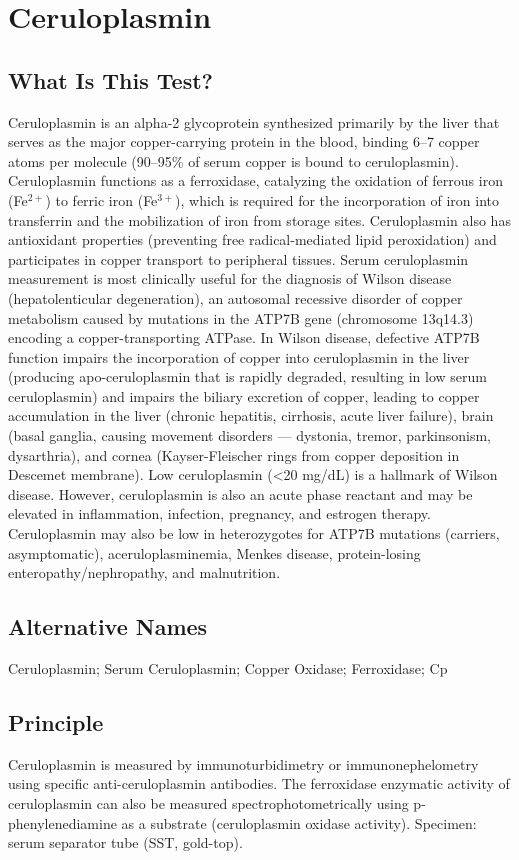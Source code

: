\chapter{Ceruloplasmin}
\section*{What Is This Test?}
Ceruloplasmin is an alpha-2 glycoprotein synthesized primarily by the liver that serves as the major copper-carrying protein in the blood, binding 6--7 copper atoms per molecule (90--95\% of serum copper is bound to ceruloplasmin). Ceruloplasmin functions as a ferroxidase, catalyzing the oxidation of ferrous iron (Fe$^{2+}$) to ferric iron (Fe$^{3+}$), which is required for the incorporation of iron into transferrin and the mobilization of iron from storage sites. Ceruloplasmin also has antioxidant properties (preventing free radical-mediated lipid peroxidation) and participates in copper transport to peripheral tissues. Serum ceruloplasmin measurement is most clinically useful for the diagnosis of Wilson disease (hepatolenticular degeneration), an autosomal recessive disorder of copper metabolism caused by mutations in the ATP7B gene (chromosome 13q14.3) encoding a copper-transporting ATPase. In Wilson disease, defective ATP7B function impairs the incorporation of copper into ceruloplasmin in the liver (producing apo-ceruloplasmin that is rapidly degraded, resulting in low serum ceruloplasmin) and impairs the biliary excretion of copper, leading to copper accumulation in the liver (chronic hepatitis, cirrhosis, acute liver failure), brain (basal ganglia, causing movement disorders --- dystonia, tremor, parkinsonism, dysarthria), and cornea (Kayser-Fleischer rings from copper deposition in Descemet membrane). Low ceruloplasmin (<20 mg/dL) is a hallmark of Wilson disease. However, ceruloplasmin is also an acute phase reactant and may be elevated in inflammation, infection, pregnancy, and estrogen therapy. Ceruloplasmin may also be low in heterozygotes for ATP7B mutations (carriers, asymptomatic), aceruloplasminemia, Menkes disease, protein-losing enteropathy/nephropathy, and malnutrition.
\section*{Alternative Names}
Ceruloplasmin; Serum Ceruloplasmin; Copper Oxidase; Ferroxidase; Cp
\section*{Principle}
Ceruloplasmin is measured by immunoturbidimetry or immunonephelometry using specific anti-ceruloplasmin antibodies. The ferroxidase enzymatic activity of ceruloplasmin can also be measured spectrophotometrically using p-phenylenediamine as a substrate (ceruloplasmin oxidase activity). Specimen: serum separator tube (SST, gold-top).
